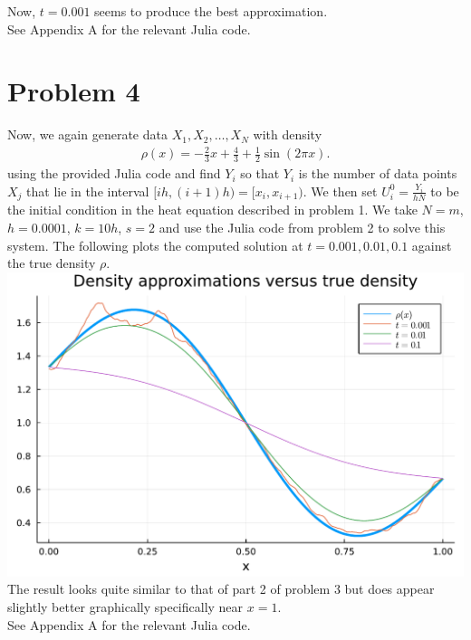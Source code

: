 \documentclass{article}
\begin{document}
Now, $t=0.001$ seems to produce the best approximation. \\
See Appendix A for the relevant Julia code.

\section{Problem 4}
Now, we again generate data $X_1,X_2,\ldots,X_N$ with density 
\begin{align*}
	\rho(x) = - \frac 2 3 x + \frac 4 3 + \frac 1 2 \sin(2 \pi x).
\end{align*}
using the provided Julia code and find $Y_i$ so that $Y_i$ is the number of data points $X_j$ that lie in the interval $[ih,(i+1)h) = [x_i,x_{i+1})$. We then set $U_i^0 = \frac{Y_i}{h N}$ to be the initial condition in the heat equation described in problem 1. We take $N = m$, $h = 0.0001$, $k = 10h$, $s = 2$ and use the Julia code from problem 2 to solve this system. The following plots the computed solution at $t = 0.001,0.01,0.1$ against the true density $\rho$. \\
\includegraphics[scale=0.5]{p4.pdf}\\
The result looks quite similar to that of part 2 of problem 3 but does appear slightly better graphically specifically near $x=1$. \\
See Appendix A for the relevant Julia code.
\end{document}
